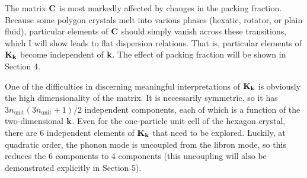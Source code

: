 \documentclass[12pt]{article}
\begin{document}
The matrix $\mathbf{C}$ is most markedly affected by changes in the packing 
fraction. Because some polygon crystals melt into various phases (hexatic, 
rotator, or plain fluid), particular elements of $\mathbf{C}$ should simply vanish 
across these transitions, which I will show leads to flat dispersion relations. 
That is, particular elements of $\mathbf{K}_{\mathbf{k}}$ become independent of $\mathbf{k}$. 
The effect of packing fraction will be shown in Section 4.

One of the difficulties in discerning meaningful interpretations of $\mathbf{K}_{\mathbf{k}}$ is obviously the high dimensionality of the matrix. It is necessarily 
symmetric, so it has $3n_\mathrm{unit} (3n_\mathrm{unit}+1)/2$ independent 
components, each of which is a function of the two-dimensional $\mathbf{k}$. Even 
for the one-particle unit cell of the hexagon crystal, there are 6 independent 
elements of $\mathbf{K}_{\mathbf{k}}$ that need to be explored. Luckily, at quadratic 
order, the phonon mode is uncoupled from the libron mode, so this reduces the 
6 components to 4 components (this uncoupling will also be demonstrated 
explicitly in Section 5).














\end{document}
